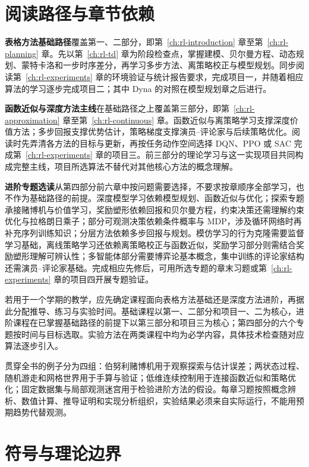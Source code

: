 \section*{阅读路径与章节依赖}

\textbf{表格方法基础路径}覆盖第一、二部分，即第~\ref{ch:rl-introduction} 章至第~\ref{ch:rl-planning} 章。先以第~\ref{ch:rl-td} 章为阶段检查点，掌握建模、贝尔曼方程、动态规划、蒙特卡洛和一步时序差分，再学习多步方法、离策略校正与模型规划。同步阅读第~\ref{ch:rl-experiments} 章的环境验证与统计报告要求，完成项目一，并随着相应算法的学习逐步完成项目二；其中 Dyna 的对照在模型规划章之后进行。

\textbf{函数近似与深度方法主线}在基础路径之上覆盖第三部分，即第~\ref{ch:rl-approximation} 章至第~\ref{ch:rl-continuous} 章。函数近似与离策略学习支撑深度价值方法；多步回报支撑优势估计，策略梯度支撑演员--评论家与后续策略优化。阅读时先弄清各方法的目标与更新，再按任务动作空间选择 DQN、PPO 或 SAC 完成第~\ref{ch:rl-experiments} 章的项目三。前三部分的理论学习与这一实现项目共同构成完整主线，项目所选算法不替代对其他核心方法的概念理解。

\textbf{进阶专题选读}从第四部分前六章中按问题需要选择，不要求按章顺序全部学习，也不作为基础路径的前提。深度模型学习依赖模型规划、函数近似与优化；探索专题承接赌博机与价值学习，奖励塑形依赖回报和贝尔曼方程，约束决策还需理解约束优化与拉格朗日乘子；部分可观测决策依赖条件概率与 MDP，涉及循环网络时再补充序列训练知识；分层方法依赖多步回报与规划。模仿学习的行为克隆需要监督学习基础，离线策略学习还依赖离策略校正与函数近似，奖励学习部分则需结合奖励塑形理解可辨认性；多智能体部分需要博弈论基本概念，集中训练的评论家结构还需演员--评论家基础。完成相应先修后，可用所选专题的章末习题或第~\ref{ch:rl-experiments} 章的项目四开展专题验证。

若用于一个学期的教学，应先确定课程面向表格方法基础还是深度方法进阶，再据此分配推导、练习与实验时间。基础课程以第一、二部分和项目一、二为核心，进阶课程在已掌握基础路径的前提下以第三部分和项目三为核心；第四部分的六个专题按时间与目标选取。实验方法在两类课程中均为必学内容，具体技术检查随对应算法逐步引入。

贯穿全书的例子分为四组：伯努利赌博机用于观察探索与估计误差；两状态过程、随机游走和网格世界用于手算与验证；低维连续控制用于连接函数近似和策略优化；固定数据集与局部观测迷宫用于检验进阶方法的假设。每章习题按照概念辨析、数值计算、推导证明和实现分析组织，实验结果必须来自实际运行，不能用预期趋势代替观测。

\section*{符号与理论边界}


